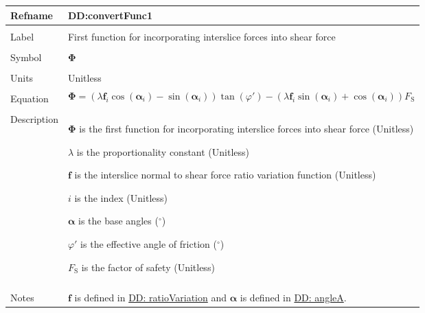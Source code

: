 \documentclass[12pt]{article}
\begin{document}
\vspace{\baselineskip}
\noindent
\begin{minipage}{\textwidth}
\begin{tabular}{>{\raggedright}p{}>{\raggedright\arraybackslash}p{}}
\toprule \textbf{Refname} & \textbf{DD:convertFunc1}
\label{DD:convertFunc1}
\\ \midrule \\
Label & First function for incorporating interslice forces into shear force
        
\\ \midrule \\
Symbol & $\mathbf{Φ}$
         
\\ \midrule \\
Units & Unitless
        
\\ \midrule \\
Equation & \begin{displaymath}
           \mathbf{Φ}=\left(λ {\mathbf{f}}_{i} \cos\left({\mathbf{α}}_{i}\right)-\sin\left({\mathbf{α}}_{i}\right)\right) \tan\left(φ'\right)-\left(λ {\mathbf{f}}_{i} \sin\left({\mathbf{α}}_{i}\right)+\cos\left({\mathbf{α}}_{i}\right)\right) {F_{\text{S}}}
           \end{displaymath}
\\ \midrule \\
Description & \begin{symbDescription}
              \item{$\mathbf{Φ}$ is the first function for incorporating interslice forces into shear force (Unitless)}
              \item{$λ$ is the proportionality constant (Unitless)}
              \item{$\mathbf{f}$ is the interslice normal to shear force ratio variation function (Unitless)}
              \item{$i$ is the index (Unitless)}
              \item{$\mathbf{α}$ is the base angles (${}^{\circ}$)}
              \item{$φ'$ is the effective angle of friction (${}^{\circ}$)}
              \item{${F_{\text{S}}}$ is the factor of safety (Unitless)}
              \end{symbDescription}
\\ \midrule \\
Notes & $\mathbf{f}$ is defined in \hyperref[DD:ratioVariation]{DD: ratioVariation} and $\mathbf{α}$ is defined in \hyperref[DD:angleA]{DD: angleA}.
        

\end{tabular}
\end{minipage}
\end{document}
